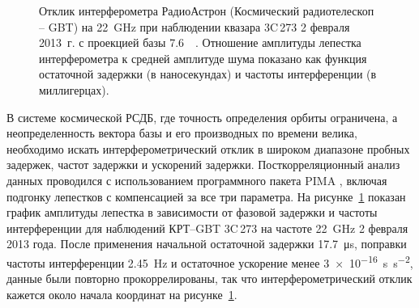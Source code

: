 \begin{figure}[tbh]
\caption{Отклик интерферометра РадиоАстрон (Космический радиотелескоп -- GBT) на \SI{22}{\GHz} при
наблюдении квазара 3C\,273 2 февраля 2013~г. с проекцией базы \SI{7.6}{\giga\la}. Отношение
амплитуды лепестка интерферометра к средней амплитуде шума показано как функция остаточной задержки
(в наносекундах) и частоты интерференции (в миллигерцах).
}
\label{fig:3c273_k_fringe}
\end{figure}

В системе космической РСДБ, где точность определения орбиты ограничена, а неопределенность вектора
базы и его производных по времени велика, необходимо искать интерферометрический отклик в широком
диапазоне пробных задержек, частот задержки и ускорений задержки. Посткорреляционный анализ данных
проводился с использованием программного пакета PIMA \cite{Petrov_2011}, включая подгонку лепестков
с компенсацией за все три параметра. На рисунке~\ref{fig:3c273_k_fringe} показан график амплитуды
лепестка в зависимости от фазовой задержки и частоты интерференции для наблюдений КРТ--GBT 3C\,273
на частоте \SI{22}{\GHz} 2 февраля 2013 года. После применения начальной остаточной задержки
\SI{17.7}{\micro\second}, поправки частоты интерференции \SI{2.45}{\hertz} и остаточное ускорение
менее \SI{3e-16}{\second\per\second^2}, данные были повторно прокоррелированы, так что
интерферометрический отклик кажется около начала координат на рисунке~\ref{fig:3c273_k_fringe}.

